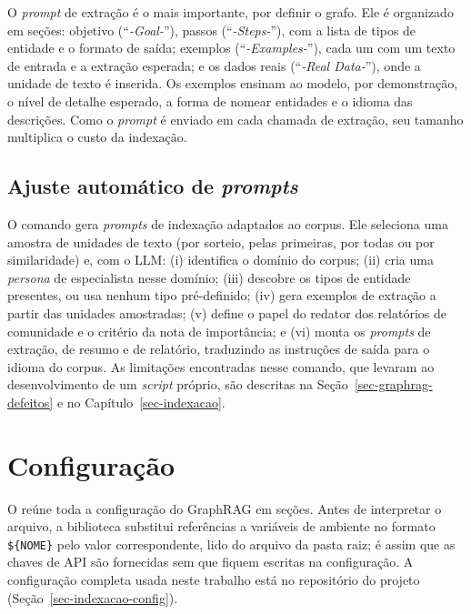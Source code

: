 O \textit{prompt} de extração é o mais importante, por definir o grafo. Ele é organizado em seções: objetivo (``\textit{-Goal-}''), passos (``\textit{-Steps-}''), com a lista de tipos de entidade e o formato de saída; exemplos (``\textit{-Examples-}''), cada um com um texto de entrada e a extração esperada; e os dados reais (``\textit{-Real Data-}''), onde a unidade de texto é inserida. Os exemplos ensinam ao modelo, por demonstração, o nível de detalhe esperado, a forma de nomear entidades e o idioma das descrições. Como o \textit{prompt} é enviado em cada chamada de extração, seu tamanho multiplica o custo da indexação.

\subsection{Ajuste automático de \textit{prompts}}
\label{sec-graphrag-prompts-tune}

O comando  gera \textit{prompts} de indexação adaptados ao corpus. Ele seleciona uma amostra de unidades de texto (por sorteio, pelas primeiras, por todas ou por similaridade) e, com o LLM: (i) identifica o domínio do corpus; (ii) cria uma \textit{persona} de especialista nesse domínio; (iii) descobre os tipos de entidade presentes, ou usa nenhum tipo pré-definido; (iv) gera exemplos de extração a partir das unidades amostradas; (v) define o papel do redator dos relatórios de comunidade e o critério da nota de importância; e (vi) monta os \textit{prompts} de extração, de resumo e de relatório, traduzindo as instruções de saída para o idioma do corpus. As limitações encontradas nesse comando, que levaram ao desenvolvimento de um \textit{script} próprio, são descritas na Seção~\ref{sec-graphrag-defeitos} e no Capítulo~\ref{sec-indexacao}.

\section{Configuração}
\label{sec-graphrag-config}

O  reúne toda a configuração do GraphRAG em seções. Antes de interpretar o arquivo, a biblioteca substitui referências a variáveis de ambiente no formato \verb|${NOME}| pelo valor correspondente, lido do arquivo  da pasta raiz; é assim que as chaves de API são fornecidas sem que fiquem escritas na configuração. A configuração completa usada neste trabalho está no repositório do projeto (Seção~\ref{sec-indexacao-config}).

